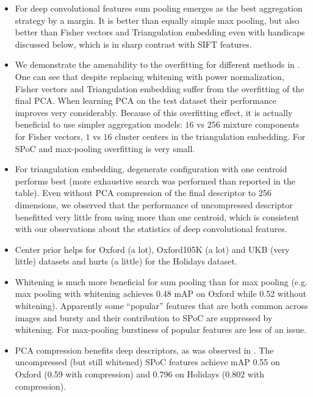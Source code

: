 \begin{itemize}
\item For deep convolutional features sum pooling emerges as the best aggregation strategy by a margin. It is better than equally simple max pooling, but also better than Fisher vectors and Triangulation embedding even with handicaps discussed below, which is in sharp contrast with SIFT features.

\item We demonstrate the amenability to the overfitting for different methods in . One can see that despite replacing whitening with power normalization, Fisher vectors and Triangulation embedding suffer from the overfitting of the final PCA. When learning PCA on the test dataset their performance improves very considerably. Because of this overfitting effect, it is actually beneficial to use simpler aggregation models: $16$ vs $256$ mixture components for Fisher vectors, $1$ vs $16$ cluster centers in the triangulation embedding. For SPoC and max-pooling overfitting is very small.

\item For triangulation embedding, degenerate configuration with one centroid performs best (more exhaustive search was performed than reported in the table). Even without PCA compression of the final descriptor to 256 dimensions, we observed that the performance of uncompressed descriptor benefitted very little from using more than one centroid, which is consistent with our observations about the statistics of deep convolutional features.



\item Center prior helps for Oxford (a lot), Oxford105K (a lot) and UKB (very little) datasets and hurts (a little) for the Holidays dataset.

\item Whitening is much more beneficial for sum pooling than for max pooling (e.g. max pooling with whitening achieves 0.48 mAP on Oxford while 0.52 without whitening). Apparently some “popular” features that are both common across images and bursty and their contribution to SPoC are suppressed by whitening. For max-pooling burstiness of popular features are less of an issue.

\item PCA compression benefits deep descriptors, as was observed in \cite{Babenko14}. The uncompressed (but still whitened) SPoC features achieve mAP 0.55 on Oxford (0.59 with compression) and 0.796 on Holidays (0.802 with compression).

\end{itemize}

